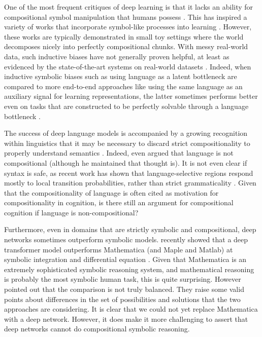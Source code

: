 One of the most frequent critiques of deep learning is that it lacks an ability for compositional symbol manipulation that humans possess \citep[e.g.][]{Lake2016,Lake2017,Marcus2018}. This has inspired a variety of works that incorporate symbol-like processes into learning \citep[e.g.][]{Mao2019}. However, these works are typically demonstrated in small toy settings where the world decomposes nicely into perfectly compositional chunks. With messy real-world data, such inductive biases have not generally proven helpful, at least as evidenced by the state-of-the-art systems on real-world datasets \citep[e.g.][]{Radford2019}. Indeed, when inductive symbolic biases such as using language as a latent bottleneck are compared to more end-to-end approaches like using the same language as an auxiliary signal for learning representations, the latter sometimes performs better even on tasks that are constructed to be perfectly solvable through a language bottleneck \citep{Mu2019}. \par  
The success of deep language models is accompanied by a growing recognition within linguistics that it may be necessary to discard strict compositionality to properly understand semantics \citep{Goldberg2015,Potts2019}. Indeed, even \citet{Fodor2001} argued that language is not compositional (although he maintained that thought is). It is not even clear if syntax is safe, as recent work has shown that language-selective regions respond mostly to local transition probabilities, rather than strict grammaticality \citet{Mollica2020}. Given that the compositionality of language is often cited as motivation for compositionality in cognition, is there still an argument for compositional cognition if language is non-compositional? \par 
Furthermore, even in domains that are strictly symbolic and compositional, deep networks sometimes outperform symbolic models. \citet{Lample2019} recently showed that a deep transformer model outperforms Mathematica (and Maple and Matlab) at symbolic integration and differential equation \citep{Lample2019}. Given that Mathematica is an extremely sophisticated symbolic reasoning system, and mathematical reasoning is probably the most symbolic human task, this is quite surprising. However \citet{Davis2019} pointed out that the comparison is not truly balanced. They raise some valid points about differences in the set of possibilities and solutions that the two approaches are considering. It is clear that we could not yet replace Mathematica with a deep network. However, it does make it more challenging to assert that deep networks cannot do compositional symbolic reasoning. \par
